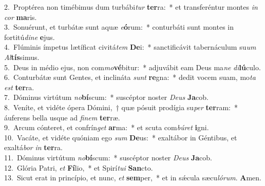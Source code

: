 {2.~}Proptérea non timébimus dum turbábi\textit{tur} \textbf{ter}ra:~* et transferéntur montes \textit{in} \textit{cor} \textbf{ma}ris.\\
{3.~}Sonuérunt, et turbátæ sunt aquæ \textit{e}\textbf{ó}rum:~* conturbáti sunt montes in fortitú\textit{di}\textit{ne} \textbf{e}jus.\\
{4.~}Flúminis ímpetus lætíficat civitá\textit{tem} \textbf{De}i:~* sanctificávit tabernáculum su\textit{um} \textit{Al}\textbf{tís}simus.\\
{5.~}Deus in médio ejus, non com\textit{mo}\textbf{vé}bitur:~* adjuvábit eam Deus ma\textit{ne} \textit{di}\textbf{lú}culo.\\
{6.~}Conturbátæ sunt Gentes, et inclináta \textit{sunt} \textbf{re}gna:~* dedit vocem suam, mo\textit{ta} \textit{est} \textbf{ter}ra.\\
{7.~}Dóminus virtútum \textit{no}\textbf{bí}scum:~* suscéptor noster \textit{De}\textit{us} \textbf{Ja}cob.\\
{8.~}Veníte, et vidéte ópera Dómini,~† quæ pósuit prodígia su\textit{per} \textbf{ter}ram:~* áuferens bella usque ad \textit{fi}\textit{nem} \textbf{ter}ræ.\\
{9.~}Arcum cónteret, et confrín\textit{get} \textbf{ar}ma:~* et scuta com\textit{bú}\textit{ret} \textbf{i}gni.\\
{10.~}Vacáte, et vidéte quóniam ego \textit{sum} \textbf{De}us:~* exaltábor in Géntibus, et exaltá\textit{bor} \textit{in} \textbf{ter}ra.\\
{11.~}Dóminus virtútum \textit{no}\textbf{bí}scum:~* suscéptor noster \textit{De}\textit{us} \textbf{Ja}cob.\\
{12.~}Glória Patri, \textit{et} \textbf{Fí}lio,~* et Spirí\textit{tu}\textit{i} \textbf{San}cto.\\
{13.~}Sicut erat in princípio, et nunc, \textit{et} \textbf{sem}per,~* et in sǽcula sæcu\textit{ló}\textit{rum}. \textbf{A}men.\\
